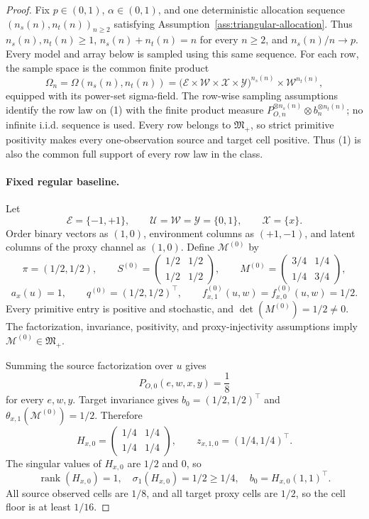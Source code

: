 \documentclass{article}
\begin{document}
\begin{proof}
Fix \(p\in(0,1)\), \(\alpha\in(0,1)\), and one deterministic allocation sequence \((n_s(n),n_t(n))_{n\ge2}\) satisfying Assumption~\ref{ass:triangular-allocation}. Thus \(n_s(n),n_t(n)\ge1\), \(n_s(n)+n_t(n)=n\) for every \(n\ge2\), and \(n_s(n)/n\to p\). Every model and array below is sampled using this same sequence. For each row, the sample space is the common finite product
\[
\Omega_n=\Omega(n_s(n),n_t(n))
=\bigl(\mathcal E\times\mathcal W\times\mathcal X\times\mathcal Y\bigr)^{n_s(n)}
\times\mathcal W^{n_t(n)},
\tag{1}
\]
equipped with its power-set sigma-field. The row-wise sampling assumptions identify the row law on (1) with the finite product measure \(P_{O,n}^{\otimes n_s(n)}\otimes b_n^{\otimes n_t(n)}\); no infinite i.i.d. sequence is used. Every row belongs to \(\mathfrak M_{+}\), so strict primitive positivity makes every one-observation source and target cell positive. Thus (1) is also the common full support of every row law in the class.

\paragraph{Fixed regular baseline.}
Let
\[
\mathcal E=\{-1,+1\},\qquad
\mathcal U=\mathcal W=\mathcal Y=\{0,1\},\qquad
\mathcal X=\{x\}.
\]
Order binary vectors as \((1,0)\), environment columns as \((+1,-1)\), and latent columns of the proxy channel as \((1,0)\). Define \(\mathcal M^{(0)}\) by
\[
\pi=(1/2,1/2),\qquad
S^{(0)}=\begin{pmatrix}1/2&1/2\\1/2&1/2\end{pmatrix},\qquad
M^{(0)}=\begin{pmatrix}3/4&1/4\\1/4&3/4\end{pmatrix},
\]
\[
a_x(u)=1,\qquad q^{(0)}=(1/2,1/2)^{\top},\qquad
f^{(0)}_{x,1}(u,w)=f^{(0)}_{x,0}(u,w)=1/2.
\tag{2}
\]
Every primitive entry is positive and stochastic, and \(\det(M^{(0)})=1/2\ne0\). The factorization, invariance, positivity, and proxy-injectivity assumptions imply \(\mathcal M^{(0)}\in\mathfrak M_{+}\).

Summing the source factorization over \(u\) gives
\[
P_{O,0}(e,w,x,y)=\frac18
\tag{3}
\]
for every \(e,w,y\). Target invariance gives \(b_0=(1/2,1/2)^{\top}\) and \(\theta_{x,1}(\mathcal M^{(0)})=1/2\). Therefore
\[
H_{x,0}=\begin{pmatrix}1/4&1/4\\1/4&1/4\end{pmatrix},
\qquad z_{x,1,0}=(1/4,1/4)^{\top}.
\tag{4}
\]
The singular values of \(H_{x,0}\) are \(1/2\) and \(0\), so
\[
\operatorname{rank}(H_{x,0})=1,
\quad \sigma_1(H_{x,0})=1/2\ge1/4,
\quad b_0=H_{x,0}(1,1)^{\top}.
\tag{5}
\]
All source observed cells are \(1/8\), and all target proxy cells are \(1/2\), so the cell floor is at least \(1/16\).


\end{proof}
\end{document}
